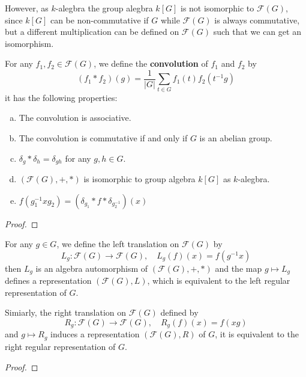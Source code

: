 However, as \(k\)-alegbra the group alegbra \(k[G]\) is not isomorphic to \(\mathcal{F}(G)\), since \(k[G]\) can be non-commutative if \(G\) while \(\mathcal{F}(G)\) is always commutative, but a different multiplication can be defined on \(\mathcal{F}(G)\) such that we can get an isomorphism.

\begin{lemma}
    For any \(f_1,f_2 \in \mathcal{F}(G)\), we define the \textbf{convolution} of \(f_1\) and \(f_2\) by
    \[(f_1 * f_2)(g) = \frac{1}{|G|} \sum_{t \in G} f_1(t) f_2(t^{-1}g)\]
    it has the following properties:
    \begin{enumerate} [(a)]
        \item The convolution is associative.
        \item The convolution is commutative if and only if \(G\) is an abelian group.
        \item \(\delta_g * \delta_h = \delta_{gh}\) for any \(g,h \in G\).
        \item \((\mathcal{F}(G),+,*)\) is isomorphic to group algebra \(k[G]\) as \(k\)-alegbra.
        \item \(f(g_1^{-1}xg_2) = (\delta_{g_1}*f*\delta_{g_2^{-1}})(x)\)
    \end{enumerate}
\end{lemma}
\begin{proof}
    
\end{proof}

\begin{proposition}
    For any \(g \in G\), we define the left translation on \(\mathcal{F}(G)\) by
    \[L_g:\mathcal{F}(G) \to \mathcal{F}(G), \quad L_g(f)(x) = f(g^{-1}x)\]
    then \(L_g\) is an algebra automorphism of \((\mathcal{F}(G),+,*)\) and the map \(g \mapsto L_g\) defines a representation \((\mathcal{F}(G),L)\), which is equivalent to the left regular representation of \(G\).

    Simiarly, the right translation on \(\mathcal{F}(G)\) defined by
    \[R_g:\mathcal{F}(G) \to \mathcal{F}(G), \quad R_g(f)(x) = f(xg)\]
    and \(g \mapsto R_g\) induces a representation \((\mathcal{F}(G),R)\) of \(G\), it is equivalent to the right regular representation of \(G\).
\end{proposition}

\begin{proof}
    
\end{proof}

